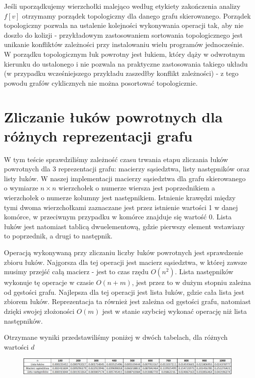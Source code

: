 \documentclass{article}
\begin{document}
Jeśli uporządkujemy wierzchołki malejąco według etykiety zakończenia analizy $f[v]$ otrzymamy porządek topologiczny dla danego grafu skierowanego. Porządek topologiczny pozwala na ustalenie kolejności wykonywania operacji tak, aby nie doszło do kolizji - przykładowym zastosowaniem sortowania topologicznego jest unikanie konfliktów zależności przy instalowaniu wielu programów jednocześnie. W porządku topologicznym łuk powrotny jest łukiem, który dąży w odwrotnym kierunku do ustalonego i nie pozwala na praktyczne zastosowania takiego układu (w przypadku wcześniejszego przykładu zaszedłby konflikt zależności) - z tego powodu grafów cyklicznych nie można posortować topologicznie.

\section{Zliczanie łuków powrotnych dla różnych reprezentacji grafu}

W tym teście sprawdziliśmy zależność czasu trwania etapu zliczania łuków powrotnych dla 3 reprezentacji grafu: macierzy sąsiedztwa, listy następników oraz listy łuków. W naszej implementacji macierzy sąsiedztwa dla grafu skierowanego o wymiarze $n\times n$ wierzchołek o numerze wiersza jest poprzednikiem a wierzchołek o numerze kolumny jest następnikiem. Istnienie krawędzi między tymi dwoma wierzchołkami zaznaczane jest przez istnienie wartości 1 w danej komórce, w przeciwnym przypadku w komórce znajduje się wartość 0. Lista łuków jest natomiast tablicą dwuelementową, gdzie pierwszy element wstawiany to poprzednik, a drugi to następnik.

Operacją wykonywaną przy zliczaniu liczby łuków powrotnych jest sprawdzenie zbioru łuków. Najgorsza dla tej operacji jest macierz sąsiedztwa, w której zawsze musimy przejść całą macierz - jest to czas rzędu $O(n^2)$. Lista następników wykonuje tę operacje w czasie $O(n+m)$, jest przez to w dużym stopniu zależna od gęstości grafu. Najlepsza dla tej operacji jest lista łuków, gdzie cała lista jest zbiorem łuków. Reprezentacja ta również jest zależna od gęstości grafu, natomiast dzięki swojej złożoności $O(m)$ jest w stanie szybciej wykonać operację niż lista następników.

Otrzymane wyniki przedstawiliśmy poniżej w dwóch tabelach, dla różnych wartości $d$

\begin{figure}[h]
\centering
\includegraphics[width=1.0\linewidth]{luki_reprezentacje_tabela}
\label{fig:luki_reprezentacje_tabela}
\end{figure}%
\end{document}
